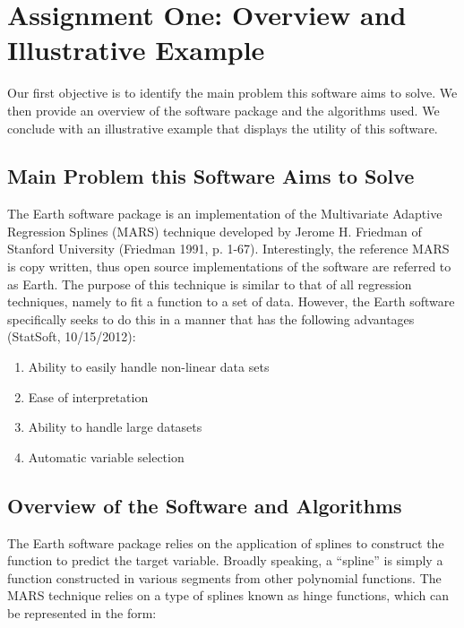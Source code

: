 

\graphicspath{{C:/Documents and Settings/amcelhinney/My Documents/GitHub/MCS507ProjectTwo/tex/include/}}

\section{Assignment One: Overview and Illustrative Example} %
\label{sec: Main Problem}
Our first objective is to identify the main problem this software aims to solve. We then provide an overview of the software package and the algorithms used. We conclude with an illustrative example that displays the utility of this software.

\subsection{Main Problem this Software Aims to Solve} %
\label{sub:methoda}
The Earth software package is an implementation of the Multivariate Adaptive Regression Splines (MARS) technique developed by Jerome H. Friedman of Stanford University (Friedman 1991, p. 1-67). Interestingly, the reference MARS is copy written, thus open source implementations of the software are referred to as Earth. The purpose of this technique is similar to that of all regression techniques, namely to fit a function to a set of data. However, the Earth software specifically seeks to do this in a manner that has the following advantages (StatSoft, 10/15/2012):
\begin{enumerate}
\item Ability to easily handle non-linear data sets
\item Ease of interpretation 
\item Ability to handle large datasets
\item Automatic variable selection
\end{enumerate}



\subsection{Overview of the Software and Algorithms} %
The Earth software package relies on the application of splines to construct the function to predict the target variable. Broadly speaking, a “spline” is simply a function constructed in various segments from other polynomial functions. The MARS technique relies on a type of splines known as hinge functions, which can be represented in the form:  

